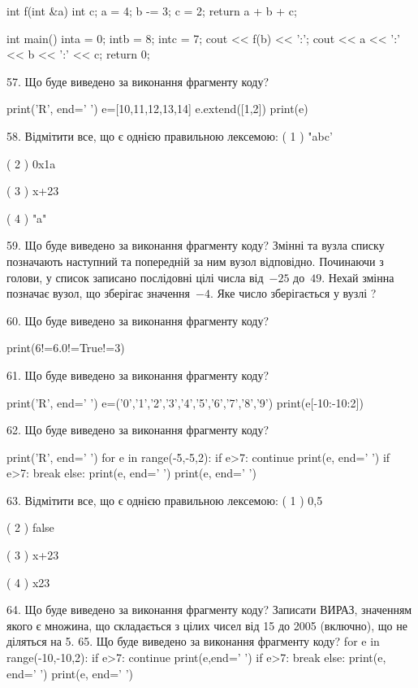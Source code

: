\documentclass[11pt]{article}
\begin{document}
int f(int &a){
int c;    a = 4;
    b -= 3;
    c = 2;
    return a + b + c;
}

int main(){
    inta = 0;
    intb = 8;
    intc = 7;
    cout << f(b) << ':';
    cout << a << ':' << b << ':' << c;
    return 0; 
}

57. Що буде виведено за виконання фрагменту коду?

print('R', end=' ')
e=[10,11,12,13,14]
e.extend([1,2])
print(e)


58. %
Відмітити все, що є однією правильною лексемою:
( 1 ) "abc'

( 2 ) 0x1a

( 3 ) x+23

( 4 ) "a\na"

59. Що буде виведено за виконання фрагменту коду?
Змінні  та  вузла списку позначають наступний та попередній за ним вузол відповідно. Починаючи з голови, у список записано послідовні цілі числа від~$-25$ до~$49$. Нехай змінна  позначає вузол, що зберігає значення~$-4$.
Яке число зберігається у вузлі  ?

60. Що буде виведено за виконання фрагменту коду?

print(6!=6.0!=True!=3)

61. Що буде виведено за виконання фрагменту коду?

print('R', end=' ')
e=('0','1','2','3','4','5','6','7','8','9')
print(e[-10:-10:2])


62. Що буде виведено за виконання фрагменту коду?

print('R', end=' ')
for e in range(-5,-5,2):
    if e>7:
        continue
        print(e, end=' ')
    if e>7:
        break
    else:
        print(e, end=' ')
    print(e, end=' ')

63. %
Відмітити все, що є однією правильною лексемою:
( 1 ) 0,5

( 2 ) false

( 3 ) x+23

( 4 ) x23

64. Що буде виведено за виконання фрагменту коду?
Записати ВИРАЗ, значенням якого є множина, що складається з цілих чисел від 15 до 2005 (включно), що не діляться на 5.
65. Що буде виведено за виконання фрагменту коду?
for e in range(-10,-10,2):
    if e>7:
        continue
        print(e,end=' ')
    if e>7:
        break
else:
    print(e, end=' ')
print(e, end=' ')
\end{document}
